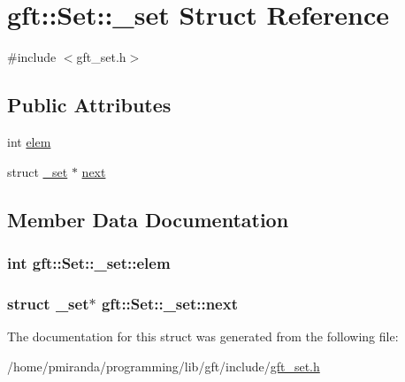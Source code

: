 \hypertarget{structgft_1_1Set_1_1__set}{}\section{gft\+:\+:Set\+:\+:\+\_\+set Struct Reference}
\label{structgft_1_1Set_1_1__set}


{\ttfamily \#include $<$gft\+\_\+set.\+h$>$}

\subsection*{Public Attributes}
\begin{DoxyCompactItemize}
\item 
int \hyperlink{structgft_1_1Set_1_1__set_a3ca042a9f1ac1a205a10b3d2fb32390a}{elem}
\item 
struct \hyperlink{structgft_1_1Set_1_1__set}{\+\_\+set} $\ast$ \hyperlink{structgft_1_1Set_1_1__set_a818575e5f6e37c77e5e47387bdded95f}{next}
\end{DoxyCompactItemize}


\subsection{Member Data Documentation}
\subsubsection[{\texorpdfstring{elem}{elem}}]{\setlength{\rightskip}{0pt plus 5cm}int gft\+::\+Set\+::\+\_\+set\+::elem}\hypertarget{structgft_1_1Set_1_1__set_a3ca042a9f1ac1a205a10b3d2fb32390a}{}\label{structgft_1_1Set_1_1__set_a3ca042a9f1ac1a205a10b3d2fb32390a}
\subsubsection[{\texorpdfstring{next}{next}}]{\setlength{\rightskip}{0pt plus 5cm}struct {\bf \+\_\+set}$\ast$ gft\+::\+Set\+::\+\_\+set\+::next}\hypertarget{structgft_1_1Set_1_1__set_a818575e5f6e37c77e5e47387bdded95f}{}\label{structgft_1_1Set_1_1__set_a818575e5f6e37c77e5e47387bdded95f}


The documentation for this struct was generated from the following file\+:\begin{DoxyCompactItemize}
\item 
/home/pmiranda/programming/lib/gft/include/\hyperlink{gft__set_8h}{gft\+\_\+set.\+h}\end{DoxyCompactItemize}
